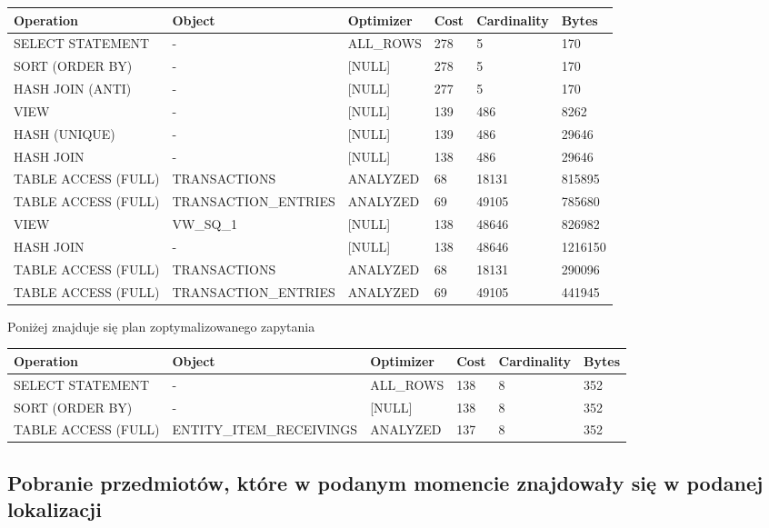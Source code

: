 \documentclass[11pt]{article}
\numberwithin{figure}{subsection}
\begin{document}
		\begin{tabularx}{\textwidth}{|X|X|X|X|X|X|}
Operation&Object&Optimizer&Cost&Cardinality&Bytes\\ \hline
SELECT STATEMENT& - &ALL\_ROWS&278&5&170\\ \hline
SORT (ORDER BY)& - &[NULL]&278&5&170\\ \hline
HASH JOIN (ANTI)& - &[NULL]&277&5&170\\ \hline
VIEW& - &[NULL]&139&486&8262\\ \hline
HASH (UNIQUE)& - &[NULL]&139&486&29646\\ \hline
HASH JOIN& - &[NULL]&138&486&29646\\ \hline
TABLE ACCESS (FULL)&TRANSACTIONS&ANALYZED&68&18131&815895\\ \hline
TABLE ACCESS (FULL)&TRANSACTION\_ENTRIES&ANALYZED&69&49105&785680\\ \hline
VIEW&VW\_SQ\_1&[NULL]&138&48646&826982\\ \hline
HASH JOIN& - &[NULL]&138&48646&1216150\\ \hline
TABLE ACCESS (FULL)&TRANSACTIONS&ANALYZED&68&18131&290096\\ \hline
TABLE ACCESS (FULL)&TRANSACTION\_ENTRIES&ANALYZED&69&49105&441945\\ \hline
		\end{tabularx}
		
		Poniżej znajduje się plan zoptymalizowanego zapytania \\
		
		\begin{tabularx}{\textwidth}{|X|X|X|X|X|X|}
Operation&Object&Optimizer&Cost&Cardinality&Bytes\\ \hline
SELECT STATEMENT& - &ALL\_ROWS&138&8&352\\ \hline
SORT (ORDER BY)& - &[NULL]&138&8&352\\ \hline
TABLE ACCESS (FULL)&ENTITY\_ITEM\_RECEIVINGS&ANALYZED&137&8&352\\ \hline
		\end{tabularx}
		
		
		
		
		
		
		
		
		
		
		
		
		
	
	\subsection{Pobranie przedmiotów, które w podanym momencie znajdowały się w
	podanej lokalizacji}
			
\end{document}
